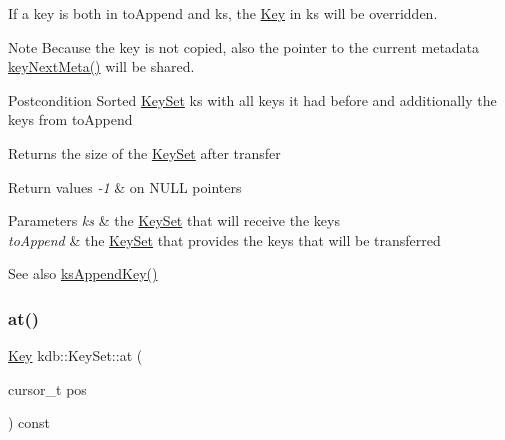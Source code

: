 If a key is both in to\+Append and ks, the \hyperlink{classkdb_1_1Key}{Key} in ks will be overridden.

\begin{DoxyNote}{Note}
Because the key is not copied, also the pointer to the current metadata \hyperlink{group__keymeta_ga4c88342f580a4291455a801af71ce048}{key\+Next\+Meta()} will be shared.
\end{DoxyNote}
\begin{DoxyPostcond}{Postcondition}
Sorted \hyperlink{classkdb_1_1KeySet}{Key\+Set} ks with all keys it had before and additionally the keys from to\+Append 
\end{DoxyPostcond}
\begin{DoxyReturn}{Returns}
the size of the \hyperlink{classkdb_1_1KeySet}{Key\+Set} after transfer 
\end{DoxyReturn}

\begin{DoxyRetVals}{Return values}
{\em -\/1} & on N\+U\+LL pointers \\
\hline
\end{DoxyRetVals}

\begin{DoxyParams}{Parameters}
{\em ks} & the \hyperlink{classkdb_1_1KeySet}{Key\+Set} that will receive the keys \\
\hline
{\em to\+Append} & the \hyperlink{classkdb_1_1KeySet}{Key\+Set} that provides the keys that will be transferred \\
\hline
\end{DoxyParams}
\begin{DoxySeeAlso}{See also}
\hyperlink{group__keyset_gaa5a1d467a4d71041edce68ea7748ce45}{ks\+Append\+Key()} 
\end{DoxySeeAlso}
\mbox{\label{classkdb_1_1KeySet_ab2821dd5568636f5e789e49562c7da21}} 
\subsubsection{\texorpdfstring{at()}{at()}}
{\footnotesize\ttfamily \hyperlink{classkdb_1_1Key}{Key} kdb\+::\+Key\+Set\+::at (\begin{DoxyParamCaption}\item[{cursor\+\_\+t}]{pos }\end{DoxyParamCaption}) const\hspace{0.3cm}{\ttfamily [inline]}}




